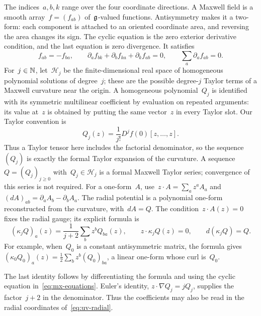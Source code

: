 \begin{definition}\label{def:mx-jets}
The indices~$a,b,k$ range over the four coordinate directions.
A Maxwell field is a smooth array~$f=(f_{ab})$ of~$\mathfrak g$-valued functions. Antisymmetry makes it a two-form: each component is attached to an oriented coordinate area, and reversing the area changes its sign. The cyclic equation is the zero exterior derivative condition, and the last equation is zero divergence. It satisfies
\begin{equation}\label{eq:mx-equations}
 f_{ab}=-f_{ba},\qquad
 \partial_af_{bk}+\partial_bf_{ka}+\partial_kf_{ab}=0,\qquad
 \sum_a\partial_af_{ab}=0.
\end{equation}
For~$j\in\mathbb N$, let~$\mathcal H_j$ be the finite-dimensional real space of homogeneous polynomial solutions of degree~$j$; these are the possible degree-$j$ Taylor terms of a Maxwell curvature near the origin.
A homogeneous polynomial~$Q_j$ is identified with its symmetric multilinear coefficient by evaluation on repeated arguments: its value at~$z$ is obtained by putting the same vector~$z$ in every Taylor slot.
Our Taylor convention is
\begin{equation*}
 Q_j(z)=\frac{1}{j!}D^jf(0)[z,\ldots,z].
\end{equation*}
Thus a Taylor tensor here includes the factorial denominator, so the sequence $(Q_j)$ is exactly the formal Taylor expansion of the curvature.
A sequence~$Q=(Q_j)_{j\ge0}$ with~$Q_j\in\mathcal H_j$ is a formal Maxwell Taylor series; convergence of this series is not required.
For a one-form~$A$, use~$z\cdot A=\sum_a z^aA_a$ and~$(dA)_{ab}=\partial_aA_b-\partial_bA_a$. The radial potential is a polynomial one-form reconstructed from the curvature, with~$dA=Q$. The condition~$z\cdot A(z)=0$ fixes the radial gauge; its explicit formula is
\begin{equation}\label{eq:mx-radial}
 (\kappa_jQ)_a(z)=\frac{1}{j+2}\sum_b z^bQ_{ba}(z),
 \qquad z\cdot\kappa_jQ(z)=0,\qquad d(\kappa_jQ)=Q.
\end{equation}
For example, when~$Q_0$ is a constant antisymmetric matrix, the formula gives~$(\kappa_0Q_0)_a(z)=\frac12\sum_bz^b(Q_0)_{ba}$, a linear one-form whose curl is~$Q_0$.
\end{definition}

The last identity follows by differentiating the formula and using the cyclic equation in~\eqref{eq:mx-equations}. Euler’s identity, $z\cdot\nabla Q_j=jQ_j$, supplies the factor~$j+2$ in the denominator.
Thus the coefficients may also be read in the radial coordinates of~\eqref{eq:uv-radial}.

